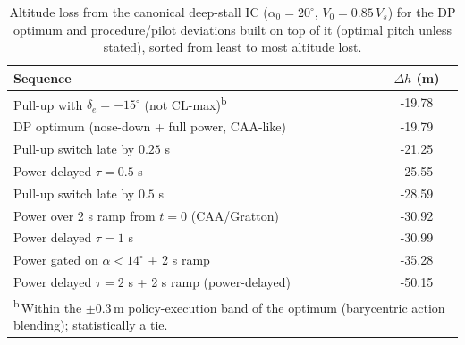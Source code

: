 \begin{table}[hbt!]
    \centering
    \caption{Altitude loss from the canonical deep-stall IC ($\alpha_0=20^\circ$, $V_0=0.85\,V_s$) for the DP optimum and procedure/pilot deviations built on top of it (optimal pitch unless stated), sorted from least to most altitude lost.}
    \label{tab:procedures}
    \begin{tabular}{lc}
        \hline
        Sequence & $\Delta h$ (m) \\
        \hline
        Pull-up with $\delta_e=-15^\circ$ (not CL-max)\textsuperscript{b} & -19.78 \\
        DP optimum (nose-down + full power, CAA-like) & -19.79 \\
        Pull-up switch late by $0.25$ s & -21.25 \\
        Power delayed $\tau=0.5$ s & -25.55 \\
        Pull-up switch late by $0.5$ s & -28.59 \\
        Power over 2 s ramp from $t=0$ (CAA/Gratton) & -30.92 \\
        Power delayed $\tau=1$ s & -30.99 \\
        Power gated on $\alpha<14^\circ$ + 2 s ramp & -35.28 \\
        Power delayed $\tau=2$ s + 2 s ramp (power-delayed) & -50.15 \\
        \hline
        \multicolumn{2}{l}{\footnotesize\textsuperscript{b}\,Within the $\pm0.3$\,m policy-execution band of the optimum (barycentric action blending); statistically a tie.}\\
    \end{tabular}
\end{table}
